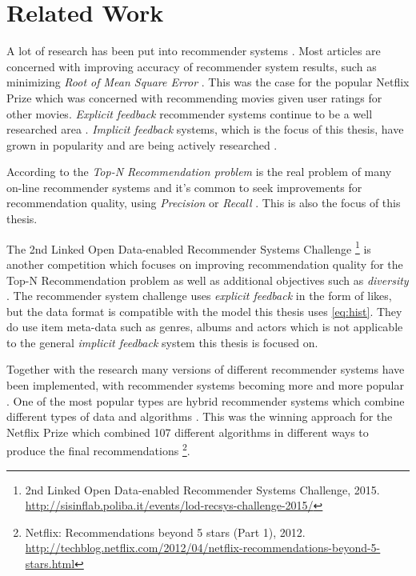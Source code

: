 \chapter{Related Work}\label{cha:relwork}

A lot of research has been put into recommender systems \citep{bobadilla2013recommender}. Most articles are concerned with improving accuracy of recommender system results, such as minimizing \textit{Root of Mean Square Error} \prmse. This was the case for the popular Netflix Prize \citep{bennett2007netflix} which was concerned with recommending movies given user ratings for other movies. \textit{Explicit feedback} recommender systems continue to be a well researched area \citep{bobadilla2013recommender}. \textit{Implicit feedback} systems, which is the focus of this thesis, have grown in popularity and are being actively researched \citep{hu2008collaborative, bobadilla2013recommender}.

According to \citep{lai2012hybrid} the \textit{Top-N Recommendation problem} is the real problem of many on-line recommender systems and it's common to seek improvements for recommendation quality, using \textit{Precision} or \textit{Recall} \citep{bobadilla2013recommender}. This is also the focus of this thesis.

The 2nd Linked Open Data-enabled Recommender Systems Challenge
\footnote{2nd Linked Open Data-enabled Recommender Systems Challenge, 2015. \url{http://sisinflab.poliba.it/events/lod-recsys-challenge-2015/}}
is another competition which focuses on improving recommendation quality for the Top-N Recommendation problem as well as additional objectives such as \textit{diversity} \citep{bobadilla2013recommender}. The recommender system challenge uses \textit{explicit feedback} in the form of likes, but the data format is compatible with the model this thesis uses \eqref{eq:hist}. They do use item meta-data such as genres, albums and actors which is not applicable to the general \textit{implicit feedback} system this thesis is focused on.

Together with the research many versions of different recommender systems have been implemented, with recommender systems becoming more and more popular \citep{bobadilla2013recommender}. One of the most popular types are hybrid recommender systems which combine different types of data and algorithms \citep{bobadilla2013recommender, lai2012hybrid}. This was the winning approach for the Netflix Prize which combined 107 different algorithms in different ways to produce the final recommendations
\footnote{ Netflix: Recommendations beyond 5 stars (Part 1), 2012. \url{http://techblog.netflix.com/2012/04/netflix-recommendations-beyond-5-stars.html} }.

